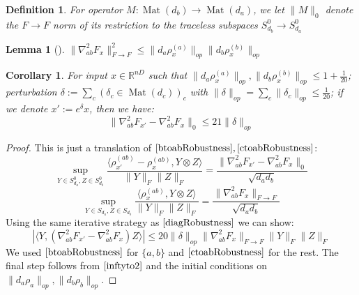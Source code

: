 \documentclass{article}
\newtheorem{corollary}[theorem]{Corollary}
\newtheorem{lemma}[theorem]{Lemma}
\newtheorem{definition}{Definition}
\newcommand{\R}{{\mathbb{R}}}
\newcommand{\mat}{\operatorname{Mat}}
\newcommand\smallSym{S}
\newcommand\samp{x}
\newcommand{\AR}[1]{{\color{orange}[AR: #1]}}
\begin{document}
\begin{definition}
For operator $M : \mat(d_{b}) \to \mat(d_{a})$, we let $\|M\|_{0}$ denote the $F \to F$ norm of its restriction to the traceless subspaces $\smallSym^0_{d_b} \to \smallSym^0_{d_a}$
\end{definition}

\begin{lemma}[\cite{KLR19}] \label{inftyto2}
$\|\nabla^{2}_{ab} F_{\samp}\|_{F \to F}^{2} \leq \|d_{a} \rho_{\samp}^{(a)}\|_{op} \|d_{b} \rho_{\samp}^{(b)}\|_{op}$
\end{lemma}

\begin{corollary} \label{offdiagRobustness}
For input $\samp \in \R^{nD}$ such that $\|d_{a} \rho_{\samp}^{(a)}\|_{op}, \|d_{b} \rho_{\samp}^{(b)}\|_{op} \leq 1+\frac{1}{20}$; perturbation $\delta := \sum_{c} (\delta_{c} \in \mat(d_{c}))_{c}$ with $\|\delta\|_{op} = \sum_{c} \|\delta_{c}\|_{op} \leq \frac{1}{20}$; if we denote $\samp' := e^{\delta} \samp$, then we have:
\[ \|\nabla^{2}_{ab} F_{\samp'} - \nabla^{2}_{ab} F_{\samp}\|_{0} \leq 21 \|\delta\|_{op}  \]
\end{corollary}
\begin{proof}
This is just a translation of $\ref{btoabRobustness},\ref{ctoabRobustness}$:
\[ \sup_{Y \in \smallSym_{d_{a}}^{0}, Z \in \smallSym_{d_{b}}^{0}} \frac{\langle \rho_{\samp'}^{(ab)} - \rho_{\samp}^{(ab)}, Y \otimes Z \rangle}{\|Y\|_{F} \|Z\|_{F}} = \frac{\|\nabla^{2}_{ab} F_{\samp'} - \nabla^{2}_{ab} F_{\samp}\|_{0}}{\sqrt{d_{a} d_{b}} } \]
\[ \sup_{Y \in \smallSym_{d_{a}}, Z \in \smallSym_{d_{b}}} \frac{\langle \rho_{\samp}^{(ab)}, Y \otimes Z \rangle}{\|Y\|_{F} \|Z\|_{F}} = \frac{\|\nabla^{2}_{ab} F_{\samp}\|_{F \to F}}{\sqrt{d_{a} d_{b}} }       \]
Using the same iterative strategy as $\ref{diagRobustness}$ we can show: 
\[ |\langle Y, (\nabla^{2}_{ab} F_{\samp'} - \nabla^{2}_{ab} F_{\samp}) Z \rangle| \leq 20 \|\delta\|_{op} \|\nabla^{2}_{ab} F_{\samp}\|_{F \to F} \|Y\|_{F} \|Z\|_{F}    \]
We used $\ref{btoabRobustness}$ for $\{a,b\}$ and $\ref{ctoabRobustness}$ for the rest. The final step follows from $\ref{inftyto2}$ and the initial conditions on $\|d_{a} \rho_{a}\|_{op}, \|d_{b} \rho_{b}\|_{op}$. 
\end{proof}
\end{document}
